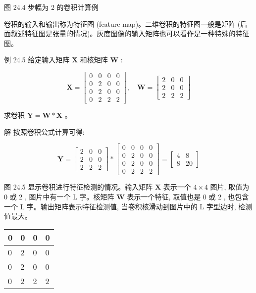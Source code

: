 \documentclass[10pt]{article}
\begin{document}
图 24.4 步幅为 2 的卷积计算例

卷积的输入和输出称为特征图 (feature map)。二维卷积的特征图一般是矩阵 (后面叙述特征图是张量的情况)。灰度图像的输入矩阵也可以看作是一种特殊的特征图。

例 24.5 给定输入矩阵 $\boldsymbol{X}$ 和核矩阵 $\boldsymbol{W}$ :

$$
\boldsymbol{X}=\left[\begin{array}{llll}
0 & 0 & 0 & 0 \\
0 & 2 & 0 & 0 \\
0 & 2 & 0 & 0 \\
0 & 2 & 2 & 2
\end{array}\right], \quad \boldsymbol{W}=\left[\begin{array}{ccc}
2 & 0 & 0 \\
2 & 0 & 0 \\
2 & 2 & 2
\end{array}\right]
$$

求卷积 $\boldsymbol{Y}=\boldsymbol{W} * \boldsymbol{X}$ 。

解 按照卷积公式计算可得:

$$
\boldsymbol{Y}=\left[\begin{array}{lll}
2 & 0 & 0 \\
2 & 0 & 0 \\
2 & 2 & 2
\end{array}\right] *\left[\begin{array}{llll}
0 & 0 & 0 & 0 \\
0 & 2 & 0 & 0 \\
0 & 2 & 0 & 0 \\
0 & 2 & 2 & 2
\end{array}\right]=\left[\begin{array}{cc}
4 & 8 \\
8 & 20
\end{array}\right]
$$

图 24.5 显示卷积进行特征检测的情况。输入矩阵 $\boldsymbol{X}$ 表示一个 $4 \times 4$ 图片, 取值为 0 或 2 , 图片中有一个 $\mathrm{L}$ 字。核矩阵 $\boldsymbol{W}$ 表示一个特征, 取值也是 0 或 2 , 也包含一个 $\mathrm{L}$ 字。输出矩阵表示特征检测值, 当卷积核滑动到图片中的 L 字型边时, 检测值最大。

\begin{center}
\begin{tabular}{|l|l|l|l|}
\hline
0 & 0 & 0 & 0 \\
\hline
0 & 2 & 0 & 0 \\
\hline
0 & 2 & 0 & 0 \\
\hline
0 & 2 & 2 & 2 \\
\hline
\end{tabular}
\end{center}
\end{document}
